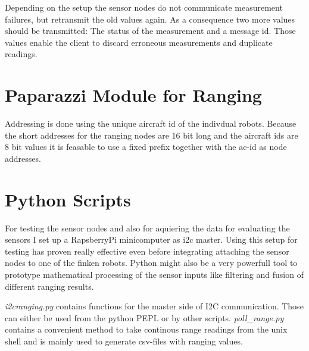 Depending on the setup the sensor nodes do not communicate measurement failures, but retransmit the old values again.
As a consequence two more values should be transmitted: The status of the measurement and a message id.
Those values enable the client to discard erroneous measurements and duplicate readings. 



\section{Paparazzi Module for Ranging}


Addressing is done using the unique aircraft id of the indivdual robots.
Because the short addresses for the ranging nodes are 16 bit long and the aircraft ids are 8 bit values it is feasable to use a fixed prefix together with the ac-id as node addresses.

\section{Python Scripts}

For testing the sensor nodes and also for aquiering the data for evaluating the sensors I set up a RapsberryPi minicomputer as i2c master.
Using this setup for testing has proven really effective even before integrating attaching the sensor nodes to one of the finken robots.
Python might also be a very powerfull tool to prototype mathematical processing of the sensor inputs like filtering and fusion of different ranging results.

\emph{i2cranging.py} contains functions for the master side of I2C communication. Those can either be used from the python PEPL or by other scripts.
\emph{poll\_range.py} contains a convenient method to take continous range readings from the unix shell and is mainly used to generate csv-files with ranging values.
